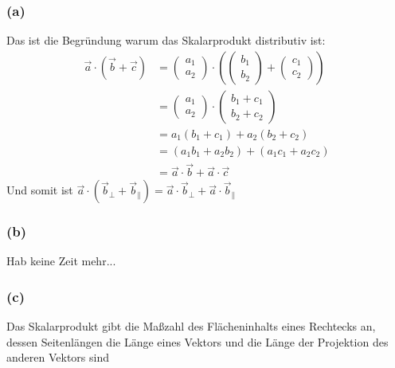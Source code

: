 \documentclass[12pt,a4paper]{article}
\begin{document}
\subsubsection*{(a)}
Das ist die Begründung warum das Skalarprodukt distributiv ist:
\begin{align*} 
    \vec{a} \cdot (\vec{b} + \vec{c})  
    &=  
    \begin{pmatrix} a_1 \\ a_2 \end{pmatrix} \cdot \left( \begin{pmatrix} b_1 \\
    b_2 \end{pmatrix} + \begin{pmatrix} c_1 \\ 
    c_2 \end{pmatrix} \right) \\
    &=  \begin{pmatrix} a_1 \\ a_2 \end{pmatrix} \cdot \begin{pmatrix} b_1 + c_1 \\ b_2 + c_2 \end{pmatrix} \\[1em] 
    &= a_1 (b_1 + c_1) + a_2 (b_2 + c_2) \\[1em] 
    &= (a_1 b_1 + a_2 b_2) + (a_1 c_1 + a_2 c_2) \\[1em] 
    &= \vec{a} \cdot \vec{b} + \vec{a} \cdot \vec{c} 
\end{align*}
Und somit ist $\vec{a} \cdot (\vec{b}_{\perp} + \vec{b}_{\parallel}) = \vec{a} \cdot \vec{b}_{\perp} + \vec{a} \cdot \vec{b}_{\parallel}$

\subsubsection*{(b)}
Hab keine Zeit mehr...

\subsubsection*{(c)}
Das Skalarprodukt gibt die Maßzahl des Flächeninhalts eines Rechtecks an, dessen Seitenlängen die Länge eines Vektors und die Länge der Projektion des anderen Vektors sind
\end{document}
